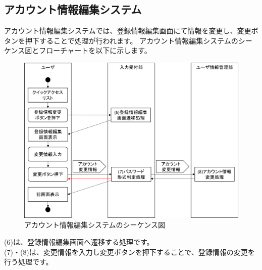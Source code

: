 \clearpage
\subsection{アカウント情報編集システム}
アカウント情報編集システムでは、登録情報編集画面にて情報を変更し、変更ボタンを押下することで処理が行われます。
アカウント情報編集システムのシーケンス図とフローチャートを以下に示します。

\begin{figure}[htbp]
  \begin{center}
    \includegraphics[width=1\linewidth,clip]{./img/seq3.png}
    \caption{アカウント情報編集システムのシーケンス図}\label{fig:seq3}
  \end{center}
\end{figure}

(6)は、登録情報編集画面へ遷移する処理です。\\
(7)・(8)は、変更情報を入力し変更ボタンを押下することで、登録情報の変更を行う処理です。

